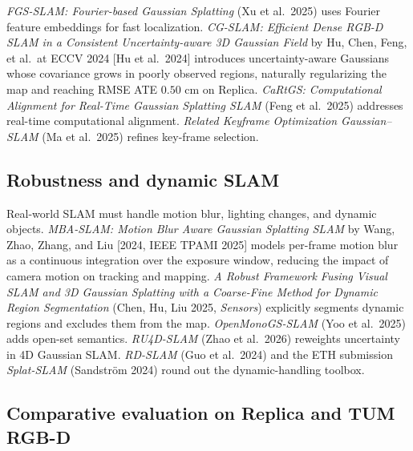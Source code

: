 \emph{FGS-SLAM: Fourier-based Gaussian Splatting} (Xu et al.~2025) uses Fourier feature embeddings for fast localization. \emph{CG-SLAM: Efficient Dense RGB-D SLAM in a Consistent Uncertainty-aware 3D Gaussian Field} by Hu, Chen, Feng, et al.~at ECCV 2024 {[}Hu et al.~2024{]} introduces uncertainty-aware Gaussians whose covariance grows in poorly observed regions, naturally regularizing the map and reaching RMSE ATE \(0.50\) cm on Replica. \emph{CaRtGS: Computational Alignment for Real-Time Gaussian Splatting SLAM} (Feng et al.~2025) addresses real-time computational alignment. \emph{Related Keyframe Optimization Gaussian--SLAM} (Ma et al.~2025) refines key-frame selection.

\subsection{Robustness and dynamic SLAM}\label{robustness-and-dynamic-slam}

Real-world SLAM must handle motion blur, lighting changes, and dynamic objects. \emph{MBA-SLAM: Motion Blur Aware Gaussian Splatting SLAM} by Wang, Zhao, Zhang, and Liu {[}2024, IEEE TPAMI 2025{]} models per-frame motion blur as a continuous integration over the exposure window, reducing the impact of camera motion on tracking and mapping. \emph{A Robust Framework Fusing Visual SLAM and 3D Gaussian Splatting with a Coarse-Fine Method for Dynamic Region Segmentation} (Chen, Hu, Liu 2025, \emph{Sensors}) explicitly segments dynamic regions and excludes them from the map. \emph{OpenMonoGS-SLAM} (Yoo et al.~2025) adds open-set semantics. \emph{RU4D-SLAM} (Zhao et al.~2026) reweights uncertainty in 4D Gaussian SLAM. \emph{RD-SLAM} (Guo et al.~2024) and the ETH submission \emph{Splat-SLAM} (Sandström 2024) round out the dynamic-handling toolbox.

\subsection{Comparative evaluation on Replica and TUM RGB-D}\label{comparative-evaluation-on-replica-and-tum-rgb-d}

